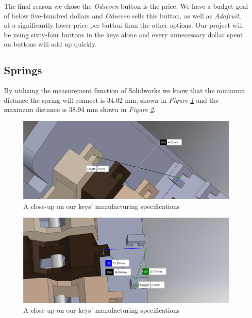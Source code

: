 The final reason we chose the \textit{Odseven} button is the price. We have a budget goal of below five-hundred dollars and \textit{Odseven} sells this button, as well as \textit{Adafruit}, at a significantly lower price per button than the other options. Our project will be using sixty-four buttons in the keys alone and every unnecessary dollar spent on buttons will add up quickly.

\subsection{Springs}
By utilizing the measurement function of Solidworks we know that the minimum distance the spring will connect is 34.02 mm, shown in \textit{Figure \ref{fig:dimensions1}} and the maximum distance is 38.94 mm shown in \textit{Figure \ref{fig:dimensions2}}.

\begin{figure}[h!]
  \centering
  \includegraphics[width=\linewidth]{image/Dimensions1.png}
  \caption{A close-up on our keys' manufacturing specifications}
  \label{fig:dimensions1}
\end{figure}

\begin{figure}[h!]
  \centering
  \includegraphics[width=\linewidth]{image/Dimensions2.png}
  \caption{A close-up on our keys' manufacturing specifications}
  \label{fig:dimensions2}
\end{figure}

